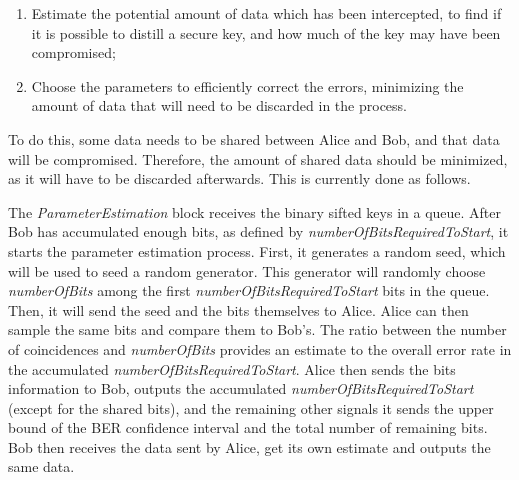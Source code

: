 \begin{enumerate}
	\item Estimate the potential amount of data which has been intercepted, to
	find if it is possible to distill a secure key, and how much of the key may
	have been compromised;
	\item Choose the parameters to efficiently correct the errors, minimizing
	the amount of data that will need to be discarded in the process.
\end{enumerate}

To do this, some data needs to be shared between Alice and Bob, and that data
will be compromised. Therefore, the amount of shared data should be minimized,
as it will have to be discarded afterwards. This is currently done as follows.

The \textit{ParameterEstimation} block receives the binary sifted keys in a
queue. After Bob has accumulated enough bits, as defined by
\textit{numberOfBitsRequiredToStart}, it starts the parameter estimation
process. First, it generates a random seed, which will be used to seed a random
generator. This generator will randomly choose \textit{numberOfBits} among the
first \textit{numberOfBitsRequiredToStart} bits in the queue. Then, it will send
the seed and the bits themselves to Alice. Alice can then sample the same bits
and compare them to Bob's. The ratio between the number of coincidences and
\textit{numberOfBits} provides an estimate to the overall error rate in the
accumulated \textit{numberOfBitsRequiredToStart}. Alice then sends the bits
information to Bob, outputs the accumulated \textit{numberOfBitsRequiredToStart}
(except for the shared bits), and the remaining other signals it sends the upper
bound of the BER confidence interval and the total number of remaining bits.
Bob then receives the data sent by Alice, get its own estimate and outputs the
same data.







